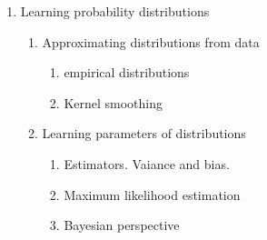 \documentclass[12pt]{amsart}
\begin{document}
\begin{enumerate}
    \item Learning probability distributions
    \begin{enumerate}
        \item Approximating distributions from data
        \begin{enumerate}
            \item empirical distributions
            \item Kernel smoothing
        \end{enumerate}
        \item Learning parameters of distributions
        \begin{enumerate}
            \item Estimators. Vaiance and bias.
            \item Maximum likelihood estimation
            \item Bayesian perspective
        \end{enumerate}
    \end{enumerate}
\end{enumerate}
\end{document}
